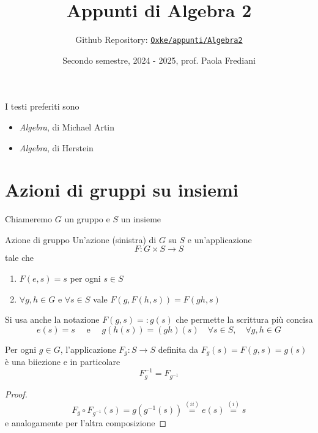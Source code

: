 

\title{Appunti di Algebra 2}
\author{Github Repository:
\href{https://github.com/Oxke/appunti/tree/main/Algebra2}{\texttt{Oxke/appunti/Algebra2}}}

\date{Secondo semestre, 2024 \-- 2025, prof. Paola Frediani}


\maketitle

I testi preferiti sono
\begin{itemize}[label = --]
    \item \textit{Algebra}, di Michael Artin
    \item \emph{Algebra}, di Herstein
\end{itemize}

\section{Azioni di gruppi su insiemi}
Chiameremo \(G\) un gruppo e \(S\) un insieme
\begin{definition}{Azione di gruppo}
    Un'azione (sinistra) di \(G\) su \(S\) e un'applicazione
    \[
      F : G\times S \to S
    \]
    tale che
\begin{enumerate}[label = \roman*)]
    \item \(F(e, s) = s\) per ogni \(s \in S\)
    \item \(\forall g, h \in G\) e \(\forall s \in S\) vale \(F{(g, F{(h, s)})}
        = F{(gh, s)}\) 
\end{enumerate}
\end{definition}
Si usa anche la notazione \(F{(g, s)} =: g{(s)}\) che permette la scrittura più
concisa
\[
  e{(s)} = s \quad \text{ e } \quad g{(h{(s)})} = {(gh)}{(s)} \quad \forall s
  \in S, \quad \forall g, h \in  G
\]
\begin{proposition}\label{prop:azione_biiezione}
    Per ogni \(g \in G\), l'applicazione \(F_g : S \to S\) definita da
    \(F_g{(s)} = F{(g, s)} = g{(s)}\) è una biiezione e in particolare
    \begin{equation}\label{eq:azione_inversa}
        F_g^{-1} = F_{g^{-1}}
    \end{equation}
\end{proposition}
\begin{proof}
    \[
      F_g \circ F_{g^{-1}} {(s)} = g{(g^{-1}{(s)})} \overset{(ii)}{=} e{(s)}
      \overset{(i)}{=} s
    \]
    e analogamente per l'altra composizione
\end{proof}

